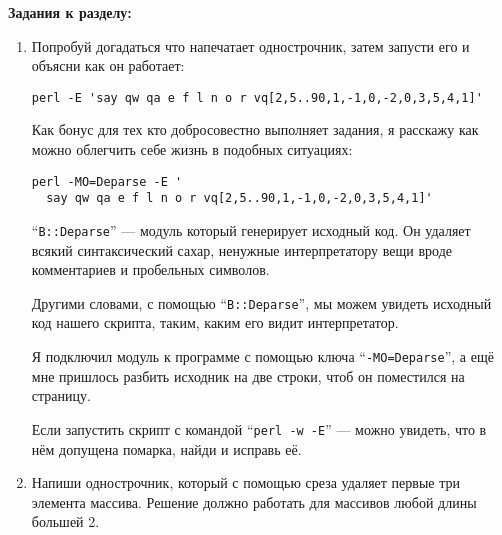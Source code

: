 {\large{\textbf{Задания к разделу:}}}
\begin{enumerate}

\item Попробуй догадаться что напечатает однострочник, затем запусти его и объясни как он работает:

\begin{verbatim}
perl -E 'say qw qa e f l n o r vq[2,5..90,1,-1,0,-2,0,3,5,4,1]'
\end{verbatim}

Как бонус для тех кто добросовестно выполняет задания, я расскажу как можно облегчить себе жизнь в 
подобных ситуациях:

\begin{verbatim}
perl -MO=Deparse -E '
  say qw qa e f l n o r vq[2,5..90,1,-1,0,-2,0,3,5,4,1]'
\end{verbatim}

``\texttt{B::Deparse}'' --- модуль который генерирует исходный код. Он удаляет всякий синтаксический сахар, 
ненужные интерпретатору вещи вроде комментариев и пробельных символов.

Другими словами, с помощью ``\texttt{B::Deparse}'', мы можем увидеть исходный код нашего скрипта, таким,
каким его видит интерпретатор.

Я подключил модуль к программе с помощью ключа ``\texttt{-MO=Deparse}'', а ещё мне пришлось разбить
исходник на две строки, чтоб он поместился на страницу. 

Если запустить скрипт с командой ``\texttt{perl -w -E}'' --- можно увидеть, что в нём допущена помарка,
найди и исправь её.

\item Напиши однострочник, который с помощью среза удаляет первые три элемента массива. Решение должно
работать для массивов любой длины большей 2.

\end{enumerate}
